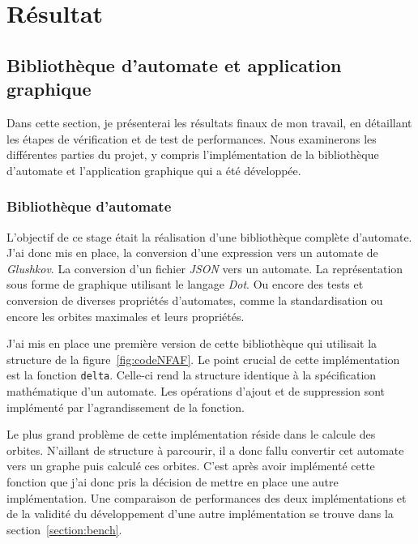 \section{Résultat}

\subsection{Bibliothèque d'automate et application graphique}

Dans cette section, je présenterai les résultats finaux de mon travail, en
détaillant les étapes de vérification et de test de performances. Nous
examinerons les différentes parties du projet, y compris l'implémentation de la    
bibliothèque d'automate et l'application graphique qui a été développée.

\subsubsection{Bibliothèque d'automate}

L'objectif de ce stage était la réalisation d'une bibliothèque complète
d'automate. J'ai donc mis en place, la conversion d'une expression vers un
automate de \textit{Glushkov}. La conversion d'un fichier \textit{JSON} vers un
automate. La représentation sous forme de graphique utilisant le langage
\textit{Dot}. Ou encore des tests et conversion de diverses propriétés
d'automates, comme la standardisation ou encore les orbites maximales et leurs
propriétés.

\vphantom{}

J'ai mis en place une première version de cette bibliothèque qui utilisait la
structure de la figure~\ref{fig:codeNFAF}. Le point crucial de cette
implémentation est la fonction \texttt{delta}. Celle-ci rend la
structure identique à la spécification mathématique d'un automate. Les
opérations d'ajout et de suppression sont implémenté par l'agrandissement de
la fonction.

\vphantom{}

Le plus grand problème de cette implémentation réside dans le calcule des
orbites. N'aillant de structure à parcourir, il a donc fallu convertir cet
automate vers un graphe puis calculé ces orbites. C'est après avoir implémenté
cette fonction que j'ai donc pris la décision de mettre en place une autre
implémentation. Une comparaison de performances des deux implémentations et de
la validité du développement d'une autre implémentation se trouve dans la
section~\ref{section:bench}.

